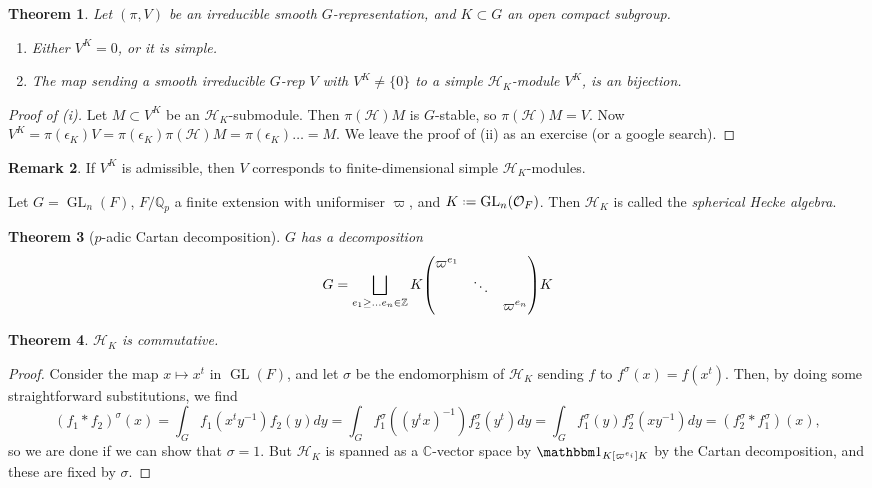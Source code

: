 \documentclass[11pt]{report}
\let\mc\mathcal
\newcommand{\1}{\mathbbm 1}
\newcommand{\Z}{\mathbb{Z}}
\newcommand{\Q}{\mathbb{Q}}
\newcommand{\C}{\mathbb{C}}
\renewcommand{\O}{\mc O}
\newcommand*{\defeq}{\mathrel{\vcenter{\baselineskip0.5ex \lineskiplimit0pt
      \hbox{\scriptsize.}\hbox{\scriptsize.}}}%
  =}
\DeclareMathOperator{\GL}{GL}
\theoremstyle{plain}
\newtheorem{thm}{Theorem}[section]
\newcounter{ex}
\theoremstyle{definition}
\newtheorem{remark}[thm]{Remark}
\theoremstyle{remark}
\numberwithin{equation}{section}
\begin{document}
\begin{thm}
  Let $(\pi,V)$ be an irreducible smooth $G$-representation, and $K \subset G$
  an open compact subgroup.
  \begin{enumerate}
  \item Either $V^{K} = 0$, or it is simple.
  \item The map sending a smooth irreducible $G$-rep $V$ with
    $V^{K} \ne \{0\}$ to a simple $\mc H_{K}$-module $V^{K}$, is an
    bijection.
  \end{enumerate}
\end{thm}
\begin{proof}[Proof of (i)]
  Let $M \subset V^{K}$ be an $\mc H_{K}$-submodule. Then $\pi(\mc H)M$ is
  $G$-stable, so $\pi(\mc H) M = V$. Now $V^{K} =\pi(\epsilon_{K})V =
  \pi(\epsilon_{K})\pi(\mc H)M = \pi(\epsilon_{K}) \ldots = M $. We leave the proof of (ii) as
  an exercise (or a google search).
\end{proof}

\begin{remark}
  If $V^{K}$ is admissible, then $V$ corresponds to finite-dimensional
  simple $\mc H_{K}$-modules. 
\end{remark}



Let $G = \GL_{n}(F)$, $F/\Q_{p}$ a finite extension with uniformiser
$\varpi$, and $K \defeq \GL_{n}(\O_{F})$. Then $\mc H_{K}$ is called
the \emph{spherical Hecke algebra}.

\begin{thm}[$p$-adic Cartan decomposition]
  $G$ has a decomposition
  \begin{equation}
    \label{eq:8}
    G = \bigsqcup_{e_{1}\ge \ldots e_{n} \in \Z} K\mqty(\varpi^{e_{1}} & & \\ &
    \ddots &\\ & & \varpi^{e_{n}})K
  \end{equation}
\end{thm}

\begin{thm}
$\mc H_{K}$ is commutative.
\end{thm}
\begin{proof}
  Consider the map $x \mapsto x^{t}$ in $\GL(F)$, and let $\sigma$ be the
  endomorphism of $\mc H_{K}$ sending $f$ to $f^{\sigma}(x) =
  f(x^{t})$. Then, by doing some straightforward substitutions, we find 
  \begin{equation}
    \label{eq:9}
    (f_{1}\ast f_{2})^{\sigma}(x) = \int_{G}f_{1}(x^{t}y^{-1})f_{2}(y)dy =
    \int_{G}f_{1}^{\sigma}((y^{t}x)^{-1})f_{2}^{\sigma}(y^{t})dy =
    \int_{G}f_{1}^{\sigma}(y)f_{2}^{\sigma}(xy^{-1})dy  = (f_{2}^{\sigma}\ast f_{1}^{\sigma})(x),
  \end{equation}
  so we are done if we can show that $\sigma = 1$. But $\mc H_{K}$ is
  spanned as a $\C$-vector space by $\1_{K[\varpi^{e_{i}}]K}$ by the Cartan decomposition,
  and these are fixed by $\sigma$. 
\end{proof}
\end{document}
